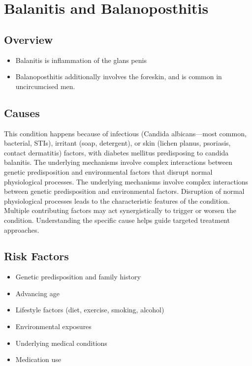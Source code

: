 \chapter{Balanitis and Balanoposthitis}
\label{sec:Balanitis and Balanoposthitis}

\section{Overview}


\begin{itemize}[noitemsep]
  \item Balanitis is inflammation of the glans penis
  \item Balanoposthitis additionally involves the foreskin, and is common in uncircumcised men.
\end{itemize}
\section{Causes}
This condition happens because of infectious (Candida albicans---most common, bacterial, STIs), irritant (soap, detergent), or skin (lichen planus, psoriasis, contact dermatitis) factors, with diabetes mellitus predisposing to candida balanitis. The underlying mechanisms involve complex interactions between genetic predisposition and environmental factors that disrupt normal physiological processes. The underlying mechanisms involve complex interactions between genetic predisposition and environmental factors. Disruption of normal physiological processes leads to the characteristic features of the condition. Multiple contributing factors may act synergistically to trigger or worsen the condition. Understanding the specific cause helps guide targeted treatment approaches.
\section{Risk Factors}


\begin{itemize}[noitemsep]
  \item Genetic predisposition and family history
  \item Advancing age
  \item Lifestyle factors (diet, exercise, smoking, alcohol)
  \item Environmental exposures
  \item Underlying medical conditions
  \item Medication use
\end{itemize}
